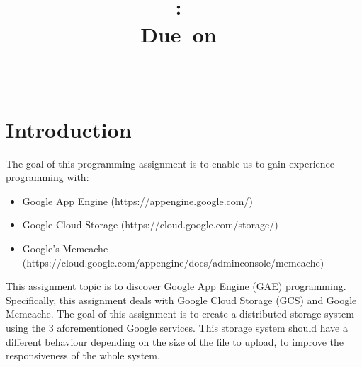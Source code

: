 \documentclass{article}
\title{
\vspace{2in}
\textmd{\textbf{\hmwkClass:\ \hmwkTitle}}\\
\normalsize\vspace{0.1in}\small{Due\ on\ \hmwkDueDate}\\
\vspace{0.1in}\large{\textit{\hmwkClassInstructor\ \hmwkClassTime}}
\vspace{3in}
}
\author{\textbf{\hmwkAuthorName}}
\date{} %
\begin{document}
\maketitle











\newpage

\tableofcontents

\newpage











\section{Introduction}

The goal of this programming assignment is to enable us to gain experience programming with:

\begin{itemize}

  \item Google App Engine (https://appengine.google.com/)

  \item Google Cloud Storage (https://cloud.google.com/storage/)

  \item Google's Memcache (https://cloud.google.com/appengine/docs/adminconsole/memcache)\\

\end{itemize}

This assignment topic is to discover Google App Engine (GAE) programming. Specifically, this assignment deals with Google Cloud Storage (GCS) and Google Memcache. The goal of this assignment is to create a distributed storage system using the 3 aforementioned Google services. This storage system should have a different behaviour depending on the size of the file to upload, to improve the responsiveness of the whole system.
\end{document}
